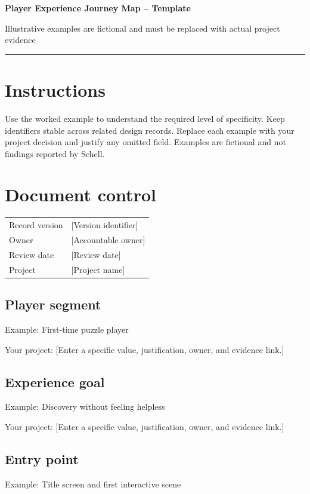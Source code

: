 \documentclass[11pt]{article}
\begin{document}
{\huge\bfseries\color{suiteblue} Player Experience Journey Map -- Template}\par
\vspace{0.15in}
{\normalsize\color{suitegray} Illustrative examples are fictional and must be replaced with actual project evidence}\par
\vspace{0.15in}\hrule\vspace{0.15in}

\section{Instructions}
Use the worked example to understand the required level of specificity. Keep identifiers stable across related design records. Replace each example with your project decision and justify any omitted field. Examples are fictional and not findings reported by Schell.


\section{Document control}
\begin{tabularx}{\linewidth}{@{}lX@{}}\toprule Record version & [Version identifier]\\ Owner & [Accountable owner]\\ Review date & [Review date]\\ Project & [Project name]\\\bottomrule\end{tabularx}

\subsection{Player segment}
Example: First-time puzzle player

Your project: [Enter a specific value, justification, owner, and evidence link.]


\subsection{Experience goal}
Example: Discovery without feeling helpless

Your project: [Enter a specific value, justification, owner, and evidence link.]


\subsection{Entry point}
Example: Title screen and first interactive scene
\end{document}
